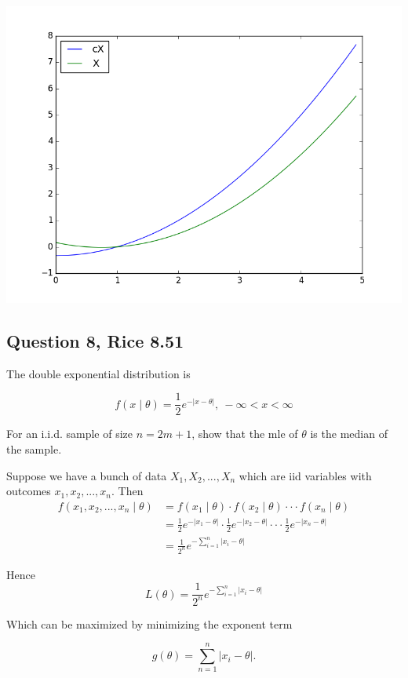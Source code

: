 \documentclass{tufte-book}
\theoremstyle{mytheoremstyle}
\theoremstyle{mylemstyle}
\theoremstyle{mydefstyle}
\begin{document}
\begin{enumerate}
\includegraphics{q7}

\end{enumerate}

\subsection{Question 8, Rice 8.51}
The double exponential distribution is

\[ f(x\mid \theta) = \frac{1}{2} e^{-|x-\theta|} , \ -\infty < x < \infty \]

For an i.i.d. sample of size $n=2m+1$, show that the mle of $\theta$ is the median of the sample.

Suppose we have a bunch of data $X_1, X_2,...,X_n$ which are iid variables with outcomes $x_1, x_2,...,x_n$.  Then
\begin{align*}
f(x_1, x_2,...,x_n \mid \theta) &= f(x_1\mid \theta)\cdot f(x_2\mid \theta)\cdot \cdot \cdot f(x_n \mid \theta)\\
&= \frac{1}{2}e^{-|x_1 - \theta|} \cdot \frac{1}{2}e^{-|x_2 - \theta|} \cdot \cdot \cdot \frac{1}{2}e^{-|x_n - \theta|}\\
&= \frac{1}{2^n} e^{-\sum_{i=1}^n|x_i -\theta|}
\end{align*}

Hence
\[ L(\theta) = \frac{1}{2^n} e^{-\sum_{i=1}^n|x_i -\theta|} \]

Which can be maximized by minimizing the exponent term

\[ g(\theta) = \sum_{n=1}^n |x_i-\theta|. \]
\end{document}
